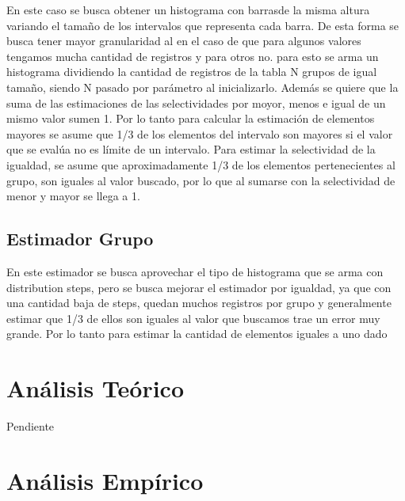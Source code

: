\documentclass[a4paper, 10pt, twoside]{article}
\begin{document}
En este caso se busca obtener un histograma con barrasde la misma altura variando el
tamaño de los intervalos que representa cada barra. De esta forma se busca tener mayor
 granularidad al en el caso de que para algunos valores tengamos mucha cantidad de
 registros y para otros no. para esto se arma un histograma dividiendo la cantidad de
 registros de la tabla N grupos de igual tamaño, siendo N pasado por parámetro al
 inicializarlo. Además se quiere que la suma de las estimaciones de las selectividades
 por moyor, menos e igual de un mismo valor sumen 1.
Por lo tanto para calcular la estimación de elementos mayores se asume que 1/3 de los
elementos del intervalo son mayores si el valor que se evalúa no es límite de un
intervalo. Para estimar la selectividad de la igualdad, se asume que aproximadamente
 1/3 de los elementos pertenecientes al grupo, son iguales al valor buscado,
 por lo que al sumarse con la selectividad de menor y mayor se llega a 1.

\subsection{Estimador Grupo}

En este estimador se busca aprovechar el tipo de histograma que se arma con distribution steps,
pero se busca mejorar el estimador por igualdad, ya que con una cantidad baja de steps, quedan muchos registros por
grupo y generalmente estimar que 1/3 de ellos son iguales al valor que buscamos trae un error muy grande.
Por lo tanto para estimar la cantidad de elementos iguales a uno dado



\section{Análisis Teórico}

Pendiente



\section{Análisis Empírico}
\end{document}
